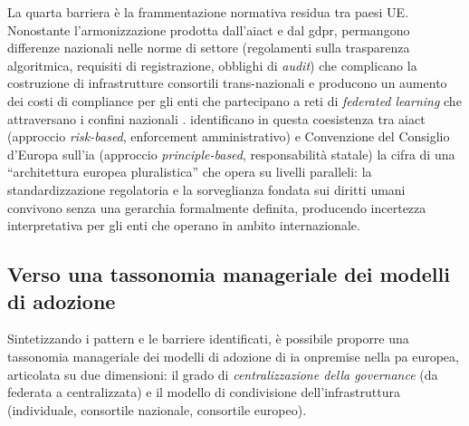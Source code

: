 La quarta barriera è la frammentazione normativa residua
tra paesi UE. Nonostante l'armonizzazione prodotta dall'\gls{aiact} e dal \gls{gdpr},
permangono differenze nazionali nelle norme di settore (regolamenti sulla
trasparenza algoritmica, requisiti di registrazione, obblighi di \textit{audit})
che complicano la costruzione di infrastrutture consortili trans-nazionali
e producono un aumento dei costi di compliance per gli enti che partecipano a
reti di \textit{federated learning} che attraversano i confini nazionali
\parencite{NaiSulis2025}. \textcite{Kovacs2026AIActCoE} identificano in questa
coesistenza tra \gls{aiact} (approccio \textit{risk-based}, enforcement amministrativo)
e Convenzione del Consiglio d'Europa sull'\gls{ia} (approccio \textit{principle-based},
responsabilità statale) la cifra di una ``architettura europea pluralistica'' che
opera su livelli paralleli: la standardizzazione regolatoria e la sorveglianza
fondata sui diritti umani convivono senza una gerarchia formalmente definita,
producendo incertezza interpretativa per gli enti che operano in ambito
internazionale.

\subsection{Verso una tassonomia manageriale dei modelli di adozione}

Sintetizzando i pattern e le barriere identificati, è possibile proporre una
tassonomia manageriale dei modelli di adozione di \gls{ia} \gls{onpremise}
nella \gls{pa} europea, articolata su due dimensioni: il grado di
\textit{centralizzazione della governance} (da federata a centralizzata) e
il modello di condivisione dell'infrastruttura (individuale, consortile
nazionale, consortile europeo).

